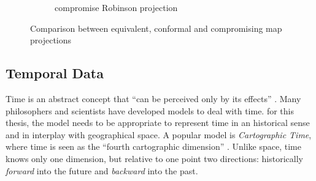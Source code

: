 \begin{figure}[ht]
\begin{subfigure}{0.55\textwidth}
    \caption{compromise Robinson projection \protect\footnotemark}
  \end{subfigure}
  \label{fig:map_projections}
  \caption{Comparison between equivalent, conformal and compromising map projections}
\end{figure}

\addtocounter{footnote}{-2}

\addtocounter{footnote}{1} %

\addtocounter{footnote}{1} %



\subsection{Temporal Data} %
\label{sub:temporal_data}

Time is an abstract concept that ``can be perceived only by its effects''
\cite[p. 27]{Langran1989timeingis}.
Many philosophers and scientists have developed models to deal with time. for this thesis, the model needs to be appropriate to represent time in an historical sense and in interplay with geographical space. A popular model is \emph{Cartographic Time}, where time is seen as the ``fourth cartographic dimension''
\cite[p. 28]{Langran1989timeingis}.
Unlike space, time knows only one dimension, but relative to one point two directions: historically \emph{forward} into the future and \emph{backward} into the past.

